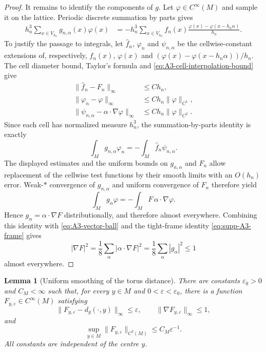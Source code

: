 \documentclass[11pt]{article}
\newtheorem{lemma}[lemma]{Lemma}
\theoremstyle{definition}
\theoremstyle{remark}
\theoremstyle{definition}
\theoremstyle{remark}
\begin{document}
\begin{proof}
It remains to identify the components of $g$.  Let $\varphi\in C^\infty(M)$ and
sample it on the lattice.  Periodic discrete summation by parts gives
\begin{align*}
 h_n^3\sum_{x\in V_{h_n}}g_{n,\alpha}(x)\varphi(x)
 &=-h_n^3\sum_{x\in V_{h_n}}f_n(x)
   \frac{\varphi(x)-\varphi(x-h_n\alpha)}{h_n}.
\end{align*}
To justify the passage to integrals, let $\widehat f_n$, $\varphi_n$ and
$\psi_{n,\alpha}$ be the cellwise-constant extensions of, respectively,
$f_n(x)$, $\varphi(x)$ and
$(\varphi(x)-\varphi(x-h_n\alpha))/h_n$.
The cell diameter bound, Taylor's formula and
\eqref{eq:A3-cell-interpolation-bound} give
\begin{align*}
 \|\widehat f_n-F_n\|_\infty&\le C h_n,\\
 \|\varphi_n-\varphi\|_\infty&\le C h_n\|\varphi\|_{C^1},\\
 \|\psi_{n,\alpha}-\alpha\cdot\nabla\varphi\|_\infty
 &\le C h_n\|\varphi\|_{C^2}.
\end{align*}
Since each cell has normalized measure $h_n^3$, the summation-by-parts
identity is exactly
\[
 \int_M g_{n,\alpha}\varphi_n
 =-\int_M\widehat f_n\psi_{n,\alpha}.
\]
The displayed estimates and the uniform bounds on $g_{n,\alpha}$ and
$F_n$ allow replacement of the cellwise test functions by their smooth
limits with an $O(h_n)$ error.  Weak-$*$ convergence of $g_{n,\alpha}$
and uniform convergence of $F_n$ therefore yield
\[
 \int_M g_\alpha\varphi
 =-\int_M F\,\alpha\cdot\nabla\varphi.
\]
Hence $g_\alpha=\alpha\cdot\nabla F$ distributionally, and therefore almost
everywhere.  Combining this identity with \eqref{eq:A3-vector-ball} and the
tight-frame identity \eqref{eq:supp-A3-frame} gives
\[
 |\nabla F|^2
 =\frac18\sum_\alpha|\alpha\cdot\nabla F|^2
 =\frac18\sum_\alpha|g_\alpha|^2\le1
\]
almost everywhere.
\end{proof}

\begin{lemma}[Uniform smoothing of the torus distance]
\label{lem:A3-uniform-distance-smoothing}
There are constants $\varepsilon_0>0$ and $C_M<\infty$ such that, for
every $y\in M$ and $0<\varepsilon<\varepsilon_0$, there is a function
$F_{y,\varepsilon}\in C^\infty(M)$ satisfying
\begin{equation}
 \|F_{y,\varepsilon}-d_g(\cdot,y)\|_\infty\le\varepsilon,
 \qquad
 \|\nabla F_{y,\varepsilon}\|_\infty\le1,
 \label{eq:A3-mollified-distance}
\end{equation}
and
\begin{equation}
 \sup_{y\in M}\|F_{y,\varepsilon}\|_{C^2(M)}
 \le C_M\varepsilon^{-1}.
 \label{eq:A3-uniform-smoothing-C2}
\end{equation}
All constants are independent of the centre $y$.
\end{lemma}
\end{document}
